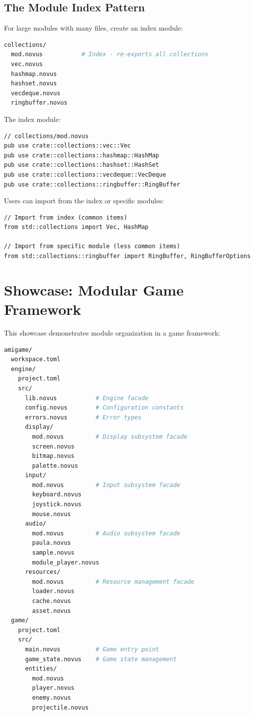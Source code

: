 \subsection{The Module Index Pattern}

For large modules with many files, create an index module:

\begin{lstlisting}[language=bash]
collections/
  mod.novus           # Index - re-exports all collections
  vec.novus
  hashmap.novus
  hashset.novus
  vecdeque.novus
  ringbuffer.novus
\end{lstlisting}

The index module:

\begin{lstlisting}
// collections/mod.novus
pub use crate::collections::vec::Vec
pub use crate::collections::hashmap::HashMap
pub use crate::collections::hashset::HashSet
pub use crate::collections::vecdeque::VecDeque
pub use crate::collections::ringbuffer::RingBuffer
\end{lstlisting}

Users can import from the index or specific modules:

\begin{lstlisting}
// Import from index (common items)
from std::collections import Vec, HashMap

// Import from specific module (less common items)
from std::collections::ringbuffer import RingBuffer, RingBufferOptions
\end{lstlisting}

\section{Showcase: Modular Game Framework}

This showcase demonstrates module organization in a game framework:

\begin{lstlisting}[language=bash]
amigame/
  workspace.toml
  engine/
    project.toml
    src/
      lib.novus           # Engine facade
      config.novus        # Configuration constants
      errors.novus        # Error types
      display/
        mod.novus         # Display subsystem facade
        screen.novus
        bitmap.novus
        palette.novus
      input/
        mod.novus         # Input subsystem facade
        keyboard.novus
        joystick.novus
        mouse.novus
      audio/
        mod.novus         # Audio subsystem facade
        paula.novus
        sample.novus
        module_player.novus
      resources/
        mod.novus         # Resource management facade
        loader.novus
        cache.novus
        asset.novus
  game/
    project.toml
    src/
      main.novus          # Game entry point
      game_state.novus    # Game state management
      entities/
        mod.novus
        player.novus
        enemy.novus
        projectile.novus
\end{lstlisting}

